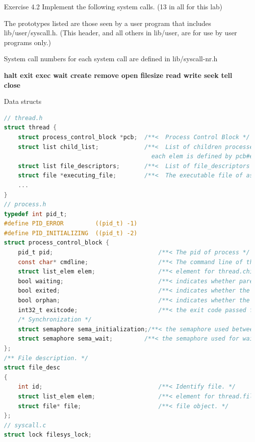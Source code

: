 \documentclass[10pt]{beamer}
\begin{document}
\begin{frame}[fragile]{Exercise 4.2}
Implement the following system calls. (13 in all for this lab)

The prototypes listed are those seen by a user program that includes lib/user/syscall.h. (This header, and all others in lib/user, are for use by user programs only.)

System call numbers for each system call are defined in lib/syscall-nr.h

\textbf{halt exit exec wait create remove open filesize read write seek tell close}
\end{frame}
\begin{frame}[fragile]{Data structs}
    \begin{lstlisting}[language=C]
// thread.h
struct thread {
    struct process_control_block *pcb;  /**<  Process Control Block */
    struct list child_list;             /**<  List of children processes of this thread,
                                          each elem is defined by pcb#elem */
    struct list file_descriptors;       /**<  List of file_descriptors the thread contains */
    struct file *executing_file;        /**<  The executable file of associated process. */
    ...
}
// process.h
typedef int pid_t;
#define PID_ERROR         ((pid_t) -1)
#define PID_INITIALIZING  ((pid_t) -2)
struct process_control_block {
    pid_t pid;                              /**< The pid of process */
    const char* cmdline;                    /**< The command line of this process being executed */
    struct list_elem elem;                  /**< element for thread.child_list */    
    bool waiting;                           /**< indicates whether parent process is waiting on this. */
    bool exited;                            /**< indicates whether the process is done (exited). */
    bool orphan;                            /**< indicates whether the parent process has terminated before. */
    int32_t exitcode;                       /**< the exit code passed from exit(), when exited = true */
    /* Synchronization */
    struct semaphore sema_initialization;/**< the semaphore used between start_process() and process_execute()*/
    struct semaphore sema_wait;         /**< the semaphore used for wait() : parent blocks until child exits*/
};
/** File description. */
struct file_desc 
{
    int id;                                 /**< Identify file. */
    struct list_elem elem;                  /**< element for thread.file_descriptors */
    struct file* file;                      /**< file object. */
};
// syscall.c
struct lock filesys_lock;
\end{lstlisting}
\end{frame}
\end{document}
